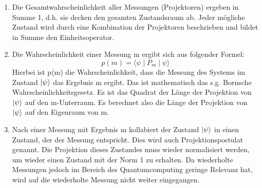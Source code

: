\begin{enumerate}
\item Die Gesamtwahrscheinlichkeit aller Messungen (Projektoren) ergeben in Summe 1, d.h. sie decken den gesamten Zustandsraum ab. Jeder mögliche Zustand wird durch eine Kombination der Projektoren beschrieben und bildet in Summe den Einheitsoperator. \\
\item Die Wahrscheinlichkeit einer Messung m ergibt sich aus folgender Formel:
\begin{equation}
    p(m) = \langle \psi \mid P_m \mid \psi \rangle
\end{equation}
Hierbei ist p(m) die Wahrscheinlichkeit, dass die Messung des Systems im Zustand $\ket\psi$ das Ergebnis m ergibt. Das ist mathematisch das s.g. Bornsche Wahrscheinlichkeitsgesetz.
Es ist das Quadrat der Länge der Projektion von $\ket\psi$ auf den m-Unterraum. Es berechnet also die Länge der Projektion von $\ket\psi$ auf den Eigenraum von m. \\
\item Nach einer Messung mit Ergebnis m kollabiert der Zustand $\ket\psi$ in einen Zustand, der der Messung entspricht. Dies wird auch Projektionspostulat genannt. Die Projektion dieses Zustandes muss wieder normalisiert werden, um wieder einen Zustand mit der Norm 1 zu erhalten.
Da wiederholte Messungen jedoch im Bereich des Quantumcomputing geringe Relevanz hat, wird auf die wiederholte Messung nicht weiter eingegangen. \\ 
\end{enumerate}

